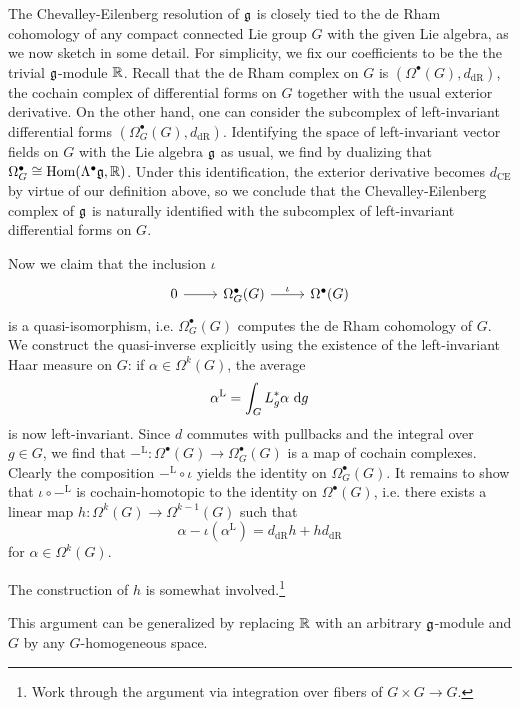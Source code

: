 \documentclass{amsart}
\begin{document}
\begin{remark}
    The Chevalley-Eilenberg resolution of $\mathfrak g$ is closely tied to the de Rham cohomology of
    any compact connected Lie group $G$ with the given Lie algebra, as we now sketch in some detail.
    For simplicity,
    we fix our coefficients to be the the trivial $\mathfrak g$-module $\mathbb{R}$. Recall that the de Rham complex on
    $G$ is $(\Omega^\bullet(G),d_\textrm{dR})$, the cochain complex of differential forms on $G$
    together with the usual exterior derivative. On the other hand, one can consider the subcomplex
    of left-invariant differential forms $(\Omega_G^\bullet(G),d_\textrm{dR})$. Identifying the
    space of left-invariant vector fields on $G$ with the Lie algebra $\mathfrak g$ as usual, we find
    by dualizing that $\Omega_G^\bullet\cong\operatorname{Hom}(\Lambda^\bullet\mathfrak g, \mathbb{R})$. Under this identification,
    the exterior derivative becomes $d_\textrm{CE}$ by virtue of our definition above, so we conclude
    that the Chevalley-Eilenberg complex of $\mathfrak g$ is naturally identified with the subcomplex of
    left-invariant differential forms on $G$.

    Now we claim that the inclusion $\iota$
    \begin{equation*}
        \begin{tikzcd}
            0\ar{r} & \Omega_G^\bullet(G)\ar{r}{\iota} & \Omega^\bullet(G)
        \end{tikzcd}
    \end{equation*}
    is a quasi-isomorphism, i.e. $\Omega_G^\bullet(G)$ computes the de Rham cohomology of $G$.
    We construct the quasi-inverse explicitly using the existence of the left-invariant Haar
    measure on $G$: if $\alpha\in\Omega^k(G)$, the average
    \begin{equation*}
        \alpha^\textrm{L} = \int_G L_g^*\alpha \d g
    \end{equation*}
    is now left-invariant. Since $d$ commutes with pullbacks and the integral over $g\in G$,
    we find that $-^\textrm{L}:\Omega^\bullet(G)\to\Omega_G^\bullet(G)$ is a map of cochain
    complexes. Clearly the composition $-^\mathrm{L}\circ\iota$ yields the identity on
    $\Omega_G^\bullet(G)$. It remains to show that $\iota\circ-^\mathrm{L}$ is cochain-homotopic
    to the identity on $\Omega^\bullet(G)$, i.e. there exists a linear map
    $h:\Omega^k(G)\to\Omega^{k-1}(G)$ such that
    \begin{equation*}
        \alpha - \iota(\alpha^\mathrm{L}) = d_\textrm{dR}h + hd_\textrm{dR}
    \end{equation*}
    for $\alpha\in\Omega^k(G)$.

    The construction of $h$ is somewhat involved.\footnote{Work through the argument
    via integration over fibers of $G\times G\to G$.}

    This argument can be generalized by replacing $\mathbb{R}$ with an arbitrary $\mathfrak g$-module
    and $G$ by any $G$-homogeneous space. 
\end{remark}
\end{document}
